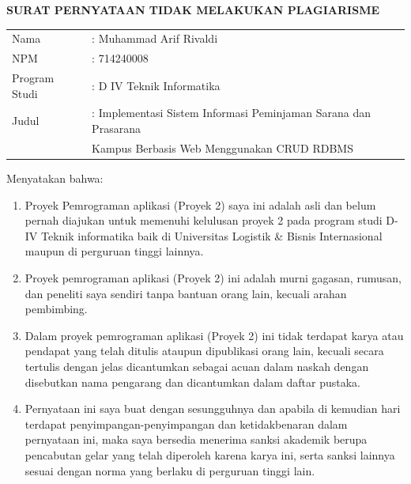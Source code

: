 

\clearpage
{}
{}
\sloppy

\begin{center}
    {\fontsize{14}{16}\selectfont\bfseries SURAT PERNYATAAN TIDAK MELAKUKAN PLAGIARISME}
\end{center}

\vspace{1cm}

\begin{tabular}{@{}ll@{}}
    Nama & : Muhammad Arif Rivaldi \\
    NPM & : 714240008 \\
    Program Studi & : D IV Teknik Informatika \\
    Judul & : Implementasi Sistem Informasi Peminjaman Sarana dan Prasarana \\
    & \hspace{2mm} Kampus Berbasis Web Menggunakan CRUD RDBMS \\
\end{tabular}

\vspace{0.5cm}

\noindent
Menyatakan bahwa:

\begin{enumerate}[leftmargin=1cm]
    \item Proyek Pemrograman aplikasi (Proyek 2) saya ini adalah asli dan belum pernah diajukan untuk memenuhi kelulusan proyek 2 pada program studi D-IV Teknik informatika baik di Universitas Logistik \& Bisnis Internasional maupun di perguruan tinggi lainnya.
    \item Proyek pemrograman aplikasi (Proyek 2) ini adalah murni gagasan, rumusan, dan peneliti saya sendiri tanpa bantuan orang lain, kecuali arahan pembimbing.
    \item Dalam proyek pemrograman aplikasi (Proyek 2) ini tidak terdapat karya atau pendapat yang telah ditulis ataupun dipublikasi orang lain, kecuali secara tertulis dengan jelas dicantumkan sebagai acuan dalam naskah dengan disebutkan nama pengarang dan dicantumkan dalam daftar pustaka.
    \item Pernyataan ini saya buat dengan sesungguhnya dan apabila di kemudian hari terdapat penyimpangan-penyimpangan dan ketidakbenaran dalam pernyataan ini, maka saya bersedia menerima sanksi akademik berupa pencabutan gelar yang telah diperoleh karena karya ini, serta sanksi lainnya sesuai dengan norma yang berlaku di perguruan tinggi lain.
\end{enumerate}

